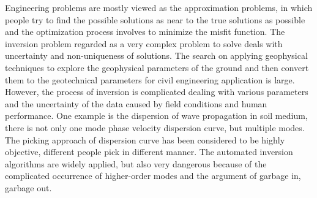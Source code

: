 Engineering problems are mostly viewed as the approximation problems, in which people try to find the possible solutions as near to the true solutions as possible and the optimization process involves to minimize the misfit function. The inversion problem regarded as a very complex problem to solve deals with uncertainty and non-uniqueness of solutions. The search on applying geophysical techniques to explore the geophysical parameters of the ground and then convert them to the geotechnical parameters for civil engineering application is large. However, the process of inversion is complicated dealing with various parameters and the uncertainty of the data caused by field conditions and human performance. One example is the dispersion of wave propagation in soil medium, there is not only one mode phase velocity dispersion curve, but multiple modes. The picking approach of dispersion curve has been considered to be highly objective, different people pick in different manner. The automated inversion algorithms are widely applied, but also very dangerous because of the complicated occurrence of higher-order modes and the argument of garbage in, garbage out.